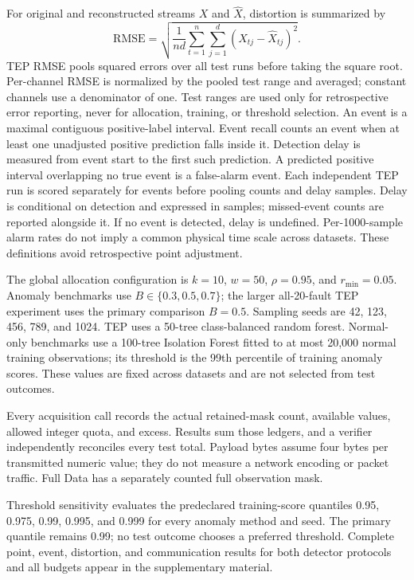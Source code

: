 \documentclass[12pt]{article}
\begin{document}
For original and reconstructed streams $X$ and $\widehat X$, distortion is
summarized by
\begin{equation}
 \mathrm{RMSE}=\sqrt{\frac{1}{nd}\sum_{t=1}^{n}\sum_{j=1}^{d}
 (X_{tj}-\widehat X_{tj})^2}.
\end{equation}
TEP RMSE pools squared errors over all test runs before taking the square root.
Per-channel RMSE is normalized by the pooled test range and averaged; constant
channels use a denominator of one. Test ranges are used only for retrospective
error reporting, never for allocation, training, or threshold selection.
An event is a maximal contiguous positive-label interval. Event recall counts
an event when at least one unadjusted positive prediction falls inside it.
Detection delay is measured from event start to the first such prediction. A
predicted positive interval overlapping no true event is a false-alarm event.
Each independent TEP run is scored separately for events before pooling counts
and delay samples. Delay is conditional on detection and expressed in samples;
missed-event counts are reported alongside it. If no event is detected, delay
is undefined. Per-1000-sample alarm rates do not imply a common physical time
scale across datasets. These definitions avoid retrospective point adjustment.

The global allocation configuration is $k=10$, $w=50$, $\rho=0.95$, and
$r_{\min}=0.05$. Anomaly benchmarks use $B\in\{0.3,0.5,0.7\}$; the larger
all-20-fault TEP experiment uses the primary comparison $B=0.5$.
Sampling seeds are 42, 123, 456,
789, and 1024. TEP uses a 50-tree class-balanced random forest. Normal-only
benchmarks use a 100-tree Isolation Forest fitted to at most 20,000 normal
training observations; its threshold is the 99th percentile of training
anomaly scores. These values are fixed across datasets and are not selected
from test outcomes.

Every acquisition call records the actual retained-mask count, available values,
allowed integer quota, and excess. Results sum those ledgers, and a verifier
independently reconciles every test total. Payload bytes assume four bytes per
transmitted numeric value; they do not measure a network encoding or packet
traffic. Full Data has a separately counted full observation mask.

Threshold sensitivity evaluates the predeclared training-score quantiles
0.95, 0.975, 0.99, 0.995, and 0.999 for every anomaly method and seed. The primary
quantile remains 0.99; no test outcome chooses a preferred threshold. Complete
point, event, distortion, and communication results for both detector protocols
and all budgets appear in the supplementary material.
\end{document}
